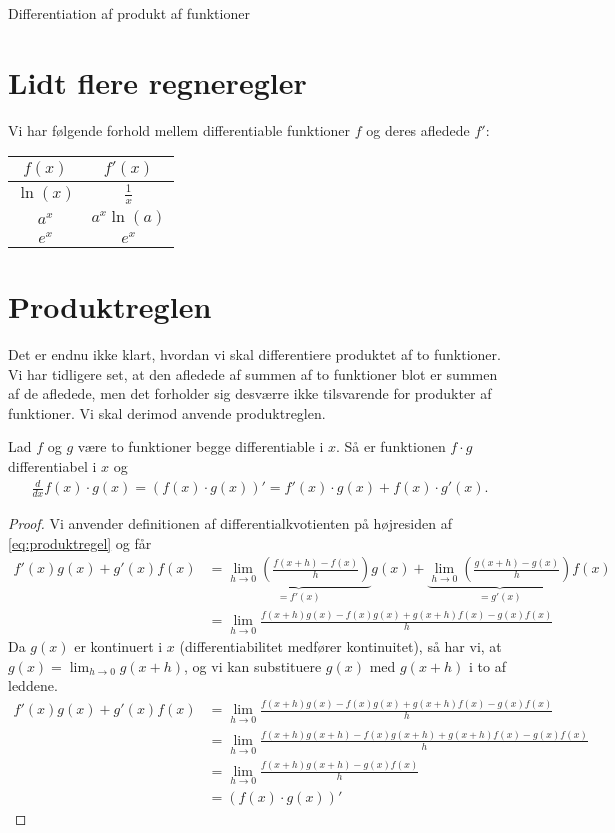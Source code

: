 
\begin{center}
\Huge
Differentiation af produkt af funktioner
\end{center}

\section*{Lidt flere regneregler}
\begin{setn}
Vi har følgende forhold mellem differentiable funktioner $f$ og deres afledede $f'$:
\begin{center}
\begin{tabular}{c|c}
$f(x)$ & $f'(x)$\\
\hline
$\ln(x)$ & $\frac{1}{x}$\\
$a^x$ & $a^x\ln(a)$\\
$e^x$ & $e^x$\\
\end{tabular}
\end{center}
\end{setn}

\section*{Produktreglen}

Det er endnu ikke klart, hvordan vi skal differentiere produktet af to funktioner. Vi har tidligere set, at den afledede af summen af to funktioner blot er summen af de afledede, men det forholder sig desværre ikke tilsvarende for produkter af funktioner. Vi skal derimod anvende produktreglen.
\begin{setn}[Produktreglen]
Lad $f$ og $g$ være to funktioner begge differentiable i $x$. Så er funktionen $f\cdot g$ differentiabel i $x$ og 
\begin{align}\label{eq:produktregel}
\frac{d}{dx} f(x)\cdot g(x) = \left(f(x)\cdot g(x)\right)' = f'(x)\cdot g(x) + f(x)\cdot g'(x).
\end{align}
\end{setn}
\begin{proof}
Vi anvender definitionen af differentialkvotienten på højresiden af \eqref{eq:produktregel} og får
\begin{align*}
f'(x)g(x)+g'(x)f(x) &= \underbrace{\lim_{h\to 0}\left(\frac{f(x+h)-f(x)}{h}\right)}_{=f'(x)}g(x) + \underbrace{\lim_{h\to 0}\left(\frac{g(x+h)-g(x)}{h}\right)}_{=g'(x)}f(x)\\
&=\lim_{h\to 0} \frac{f(x+h)g(x)-f(x)g(x)+g(x+h)f(x)-g(x)f(x)}{h}
\end{align*}
Da $g(x)$ er kontinuert i $x$ (differentiabilitet medfører kontinuitet), så har vi, at $g(x) = \lim_{h\to 0}g(x+h)$, og vi kan substituere $g(x)$ med $g(x+h)$ i to af leddene.
\begin{align*}
f'(x)g(x)+g'(x)f(x) &=  \lim_{h\to 0} \frac{f(x+h)g(x)-f(x)g(x)+g(x+h)f(x)-g(x)f(x)}{h}\\
&=\lim_{h\to 0} \frac{f(x+h)g(x+h)-f(x)g(x+h)+g(x+h)f(x)-g(x)f(x)}{h}\\
&=\lim_{h\to 0} \frac{f(x+h)g(x+h) -g(x)f(x)}{h}\\
&= (f(x)\cdot g(x))'
\end{align*}
\end{proof}

